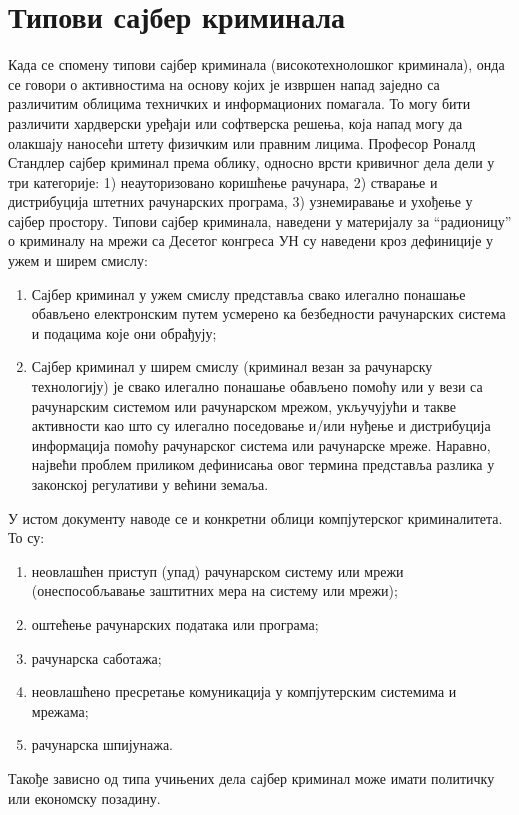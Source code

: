 \documentclass[a4paper]{article}
\begin{document}
	\section{Типови сајбер криминала}
	\label{sec:TipoviVisKri}
	Када се спомену типови сајбер криминала (високотехнолошког
	криминала), онда се говори о активностима на основу којих је извршен напад заједно са различитим облицима техничких и информационих помагала. То могу бити различити хардверски уређаји или софтверска решења, која напад могу да олакшају наносећи штету физичким или правним лицима. \newline
	Професор Роналд Стандлер сајбер криминал према облику, односно врсти кривичног дела дели у три категорије: 1) неауторизовано коришћење рачунара, 2) стварање и дистрибуција штетних рачунарских програма, 3) узнемиравање и ухођење у сајбер простору. \newline
	Типови сајбер криминала, наведени у материјалу за “радионицу” о криминалу на мрежи са Десетог конгреса УН су наведени кроз дефиниције у ужем и ширем смислу:
	\begin{enumerate}
		\item Сајбер криминал у ужем смислу представља свако илегално понашање обављено електронским путем усмерено ка безбедности рачунарских система и подацима које они обрађују;
		\item Сајбер криминал у ширем смислу (криминал везан за рачунарску технологију) је свако илегално понашање обављено помоћу или у вези са рачунарским системом или рачунарском мрежом, укључујући и такве активности као што су илегално поседовање и/или нуђење и дистрибуција информација помоћу рачунарског система или рачунарске мреже. Наравно, највећи проблем приликом дефинисања овог термина представља разлика у законској регулативи у већини земаља.
	\end{enumerate}
	
	У истом документу наводе се и конкретни облици компјутерског криминалитета. То су:
	\begin{enumerate}
		\item неовлашћен приступ (упад) рачунарском систему или мрежи (онеспособљавање заштитних мера на систему или мрежи);
		\item оштећење рачунарских података или програма;
		\item рачунарска саботажа;
		\item неовлашћено пресретање комуникација у компјутерским системима и мрежама;
		\item рачунарска шпијунажа.
	\end{enumerate}
	Такође зависно од типа учињених дела сајбер криминал може имати политичку или економску позадину. \newline
	
\end{document}
